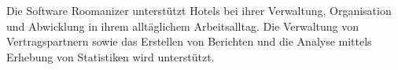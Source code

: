 \documentclass[../../Pflichtenheft.tex]{subfiles}
\begin{document}
	Die Software Roomanizer unterstützt Hotels bei ihrer Verwaltung, Organisation
	und Abwicklung in ihrem alltäglichem Arbeitsalltag. Die Verwaltung von Vertragspartnern
	sowie das Erstellen von Berichten und die Analyse mittels Erhebung von Statistiken wird
	unterstützt.
\end{document}
